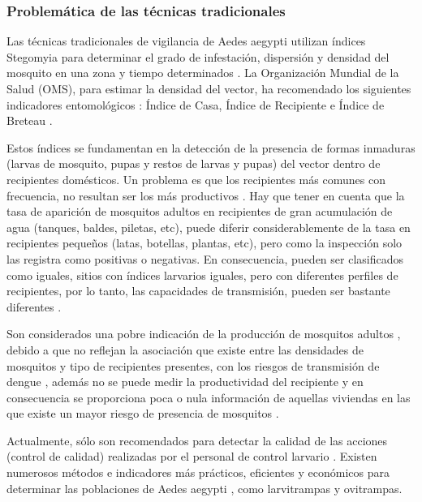 \subsubsection{Problemática de las técnicas tradicionales}
Las técnicas tradicionales de vigilancia de Aedes aegypti utilizan índices Stegomyia para
determinar el grado de infestación, dispersión y densidad del mosquito en una zona y tiempo
determinados \cite{NINO2011}. La Organización Mundial de la Salud (OMS), para estimar la densidad
del vector, ha recomendado los siguientes indicadores entomológicos : Índice de Casa, Índice de
Recipiente e Índice de Breteau \cite{cenaprece2013}.

Estos índices se fundamentan en la detección de la presencia de formas inmaduras (larvas de
mosquito, pupas y restos de larvas y pupas) del vector dentro de recipientes domésticos. Un
problema es que los recipientes más comunes con frecuencia, no resultan ser los más
productivos \cite{world2009dengue}. Hay que tener en cuenta que la tasa de aparición de mosquitos
adultos en recipientes de gran acumulación de agua (tanques, baldes, piletas, etc), puede diferir
considerablemente de la tasa en recipientes pequeños (latas, botellas, plantas, etc), pero como
la inspección solo las registra como positivas o negativas. En consecuencia, pueden ser
clasificados como iguales, sitios con índices larvarios iguales, pero con diferentes perfiles de
recipientes, por lo tanto, las capacidades de transmisión, pueden ser bastante diferentes
\cite{world2009dengue}.

Son considerados una pobre indicación de la producción de mosquitos adultos
\cite{world2009dengue, cenaprece2013}, debido a que no reflejan la asociación que existe entre las
densidades de mosquitos y tipo de recipientes presentes, con los riesgos de transmisión de dengue
\cite{cenaprece2013}, además no se puede medir la productividad del recipiente
\cite{world2009dengue} y en consecuencia se proporciona poca o nula información de aquellas
viviendas en las que existe un mayor riesgo de presencia de mosquitos \cite{cenaprece2013}.

Actualmente, sólo son recomendados para detectar la calidad de las acciones (control de calidad)
realizadas por el personal de control larvario \cite{cenaprece2013}. Existen numerosos métodos e
indicadores más prácticos, eficientes y económicos para determinar las poblaciones de Aedes
aegypti \cite{cenaprece2013}, como larvitrampas y ovitrampas.
